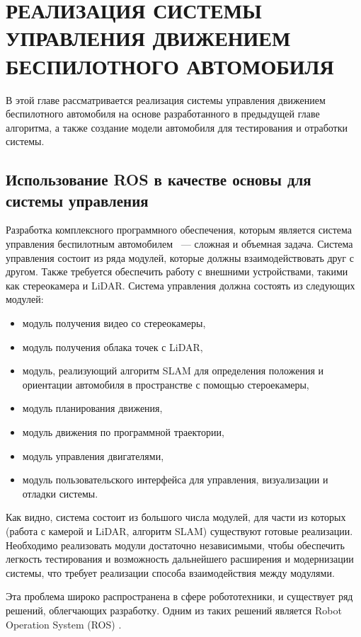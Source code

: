 \chapter{РЕАЛИЗАЦИЯ СИСТЕМЫ УПРАВЛЕНИЯ ДВИЖЕНИЕМ БЕСПИЛОТНОГО АВТОМОБИЛЯ}
В этой главе рассматривается реализация системы управления движением беспилотного автомобиля на основе разработанного
в предыдущей главе алгоритма, а также создание модели автомобиля для тестирования и отработки системы.

\section{Использование ROS в качестве основы для системы управления}
Разработка комплексного программного обеспечения, которым является система управления беспилотным автомобилем ~---
сложная и объемная задача. Система управления состоит из ряда модулей, которые должны взаимодействовать друг с другом.
Также требуется обеспечить работу с внешними устройствами, такими как стереокамера и LiDAR. Система управления должна
состоять из следующих модулей:
\begin{itemize}
    \item модуль получения видео со стереокамеры,
    \item модуль получения облака точек с LiDAR,
    \item модуль, реализующий алгоритм SLAM для определения положения и ориентации автомобиля в пространстве с помощью
          стероекамеры,
    \item модуль планирования движения,
    \item модуль движения по программной траектории,
    \item модуль управления двигателями,
    \item модуль пользовательского интерфейса для управления, визуализации и отладки системы.
\end{itemize}

Как видно, система состоит из большого числа модулей, для части из которых (работа с камерой и LiDAR, алгоритм SLAM)
существуют готовые реализации. Необходимо реализовать модули достаточно независимыми, чтобы обеспечить легкость тестирования
и возможность дальнейшего расширения и модернизации системы, что требует реализации способа взаимодействия между модулями.

Эта проблема широко распространена в сфере робототехники, и существует ряд решений, облегчающих разработку. Одним из
таких решений является Robot Operation System (ROS) \cite{ros}.

